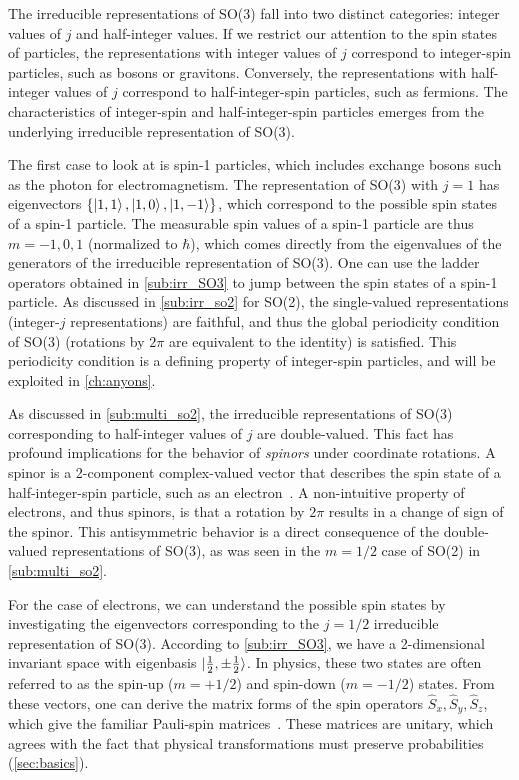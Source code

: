 The irreducible representations of SO(3) fall into two distinct categories: integer values of $j$ and half-integer values. If we restrict our attention to the spin states of particles, the representations with integer values of $j$ correspond to integer-spin particles, such as bosons or gravitons. Conversely, the representations with half-integer values of $j$ correspond to half-integer-spin particles, such as fermions. The characteristics of integer-spin and half-integer-spin particles emerges from the underlying irreducible representation of SO(3).

The first case to look at is spin-1 particles, which includes exchange bosons such as the photon for electromagnetism. The representation of SO(3) with $j=1$ has eigenvectors $\left\{ \ket{1,1}, \ket{1,0}, \ket{1,-1} \right\}$, which correspond to the possible spin states of a spin-1 particle. The measurable spin values of a spin-1 particle are thus $m=-1,0,1$ (normalized to $\hbar$), which comes directly from the eigenvalues of the generators of the irreducible representation of SO(3). One can use the ladder operators obtained in \cref{sub:irr_SO3} to jump between the spin states of a spin-1 particle. As discussed in \cref{sub:irr_so2} for SO(2), the single-valued representations (integer-$j$ representations) are faithful, and thus the global periodicity condition of SO(3) (rotations by $2\pi$ are equivalent to the identity) is satisfied. This periodicity condition is a defining property of integer-spin particles, and will be exploited in \cref{ch:anyons}.

As discussed in \cref{sub:multi_so2}, the irreducible representations of SO(3) corresponding to half-integer values of $j$ are double-valued. This fact has profound implications for the behavior of \textit{spinors} under coordinate rotations. A spinor is a 2-component complex-valued vector that describes the spin state of a half-integer-spin particle, such as an electron~\cite{Griffiths2018}. A non-intuitive property of electrons, and thus spinors, is that a rotation by $2\pi$ results in a change of sign of the spinor. This antisymmetric behavior is a direct consequence of the double-valued representations of SO(3), as was seen in the $m=1/2$ case of SO(2) in \cref{sub:multi_so2}.

For the case of electrons, we can understand the possible spin states by investigating the eigenvectors corresponding to the $j=1/2$ irreducible representation of SO(3). According to \cref{sub:irr_SO3}, we have a 2-dimensional invariant space with eigenbasis $\ket{\frac{1}{2},\pm \frac{1}{2}}$. In physics, these two states are often referred to as the spin-up ($m=+1/2$) and spin-down ($m=-1/2$) states. From these vectors, one can derive the matrix forms of the spin operators $\hat{S}_x,\hat{S}_y,\hat{S}_z$, which give the familiar Pauli-spin matrices~\cite{Griffiths2018}. These matrices are unitary, which agrees with the fact that physical transformations must preserve probabilities (\cref{sec:basics}).

